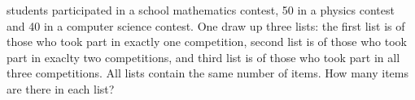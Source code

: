  students participated in a school mathematics contest,
50 in a physics contest and
40 in a computer science contest.
One draw up three lists:
the first list is of those who took part in exactly one competition,
second list is of those who took part in exaclty two competitions, and
third list is of those who took part in all three competitions.
All lists contain the same number of items.
How many items are there in each list?
\solution
\endproblem
